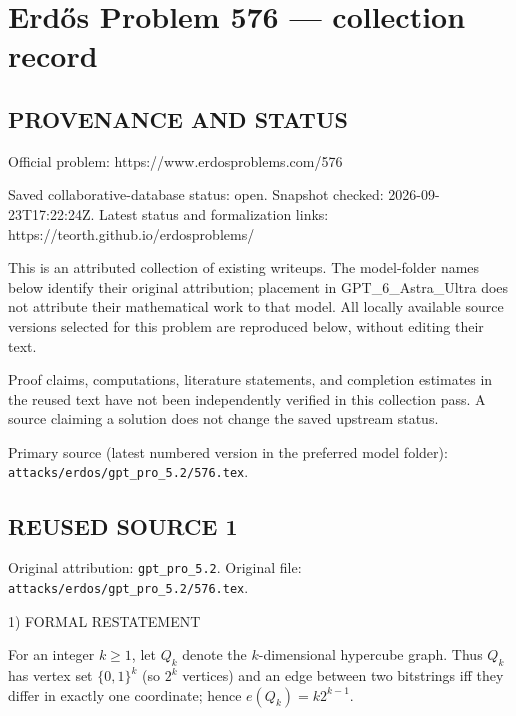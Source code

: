 \section*{Erd\H{o}s Problem 576 --- collection record}

\subsection*{PROVENANCE AND STATUS}
Official problem: https://www.erdosproblems.com/576

Saved collaborative-database status: open.
Snapshot checked: 2026-09-23T17:22:24Z.
Latest status and formalization links: https://teorth.github.io/erdosproblems/

This is an attributed collection of existing writeups. The model-folder names below identify their original attribution; placement in GPT\_6\_Astra\_Ultra does not attribute their mathematical work to that model. All locally available source versions selected for this problem are reproduced below, without editing their text.

Proof claims, computations, literature statements, and completion estimates in the reused text have not been independently verified in this collection pass. A source claiming a solution does not change the saved upstream status.

Primary source (latest numbered version in the preferred model folder): \texttt{attacks/erdos/gpt\_pro\_5.2/576.tex}.

\subsection*{REUSED SOURCE 1}
Original attribution: \texttt{gpt\_pro\_5.2}.
Original file: \texttt{attacks/erdos/gpt\_pro\_5.2/576.tex}.


1) FORMAL RESTATEMENT

For an integer $k\ge 1$, let $Q_k$ denote the $k$-dimensional hypercube graph.
Thus $Q_k$ has vertex set $\{0,1\}^k$ (so $2^k$ vertices) and an edge between two bitstrings iff they differ in exactly one coordinate; hence $e(Q_k)=k2^{k-1}$.

